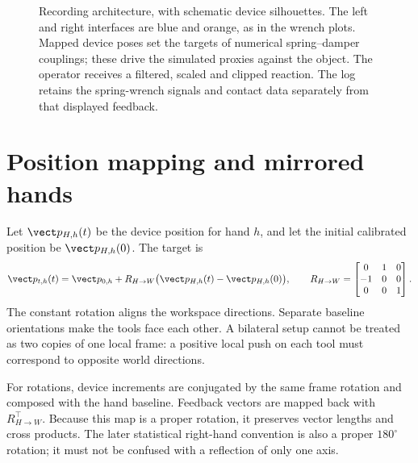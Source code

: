 \begin{figure}[htbp]
\caption{Recording architecture, with schematic device silhouettes. The left and right interfaces are blue and orange, as in the wrench plots. Mapped device poses set the targets of numerical spring--damper couplings; these drive the simulated proxies against the object. The operator receives a filtered, scaled and clipped reaction. The log retains the spring-wrench signals and contact data separately from that displayed feedback.}
\label{fig:recording}
\end{figure}

\section{Position mapping and mirrored hands}

Let $\vect p_{H,h}(t)$ be the device position for hand $h$, and let the initial calibrated position be $\vect p_{H,h}(0)$. The target is
\begin{equation}
\vect p_{t,h}(t)=\vect p_{0,h}+R_{H\rightarrow W}
\bigl(\vect p_{H,h}(t)-\vect p_{H,h}(0)\bigr),
\qquad
R_{H\rightarrow W}=\begin{bmatrix}0&1&0\\-1&0&0\\0&0&1\end{bmatrix}.
\label{eq:haptic-map}
\end{equation}
The constant rotation aligns the workspace directions. Separate baseline orientations make the tools face each other. A bilateral setup cannot be treated as two copies of one local frame: a positive local push on each tool must correspond to opposite world directions.

For rotations, device increments are conjugated by the same frame rotation and composed with the hand baseline. Feedback vectors are mapped back with $R_{H\rightarrow W}^\top$. Because this map is a proper rotation, it preserves vector lengths and cross products. The later statistical right-hand convention is also a proper $180^\circ$ rotation; it must not be confused with a reflection of only one axis.

